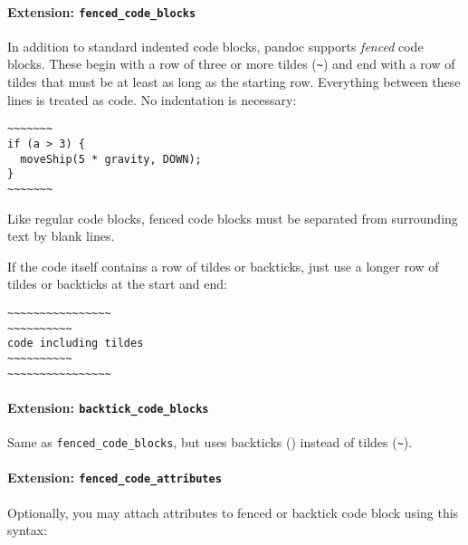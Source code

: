\documentclass[]{article}
\begin{document}
\hypertarget{extension-fenced_code_blocks}{%
\paragraph{\texorpdfstring{Extension:
\texttt{fenced\_code\_blocks}}{Extension: fenced\_code\_blocks}}\label{extension-fenced_code_blocks}}

In addition to standard indented code blocks, pandoc supports
\emph{fenced} code blocks. These begin with a row of three or more
tildes (\texttt{\textasciitilde{}}) and end with a row of tildes that
must be at least as long as the starting row. Everything between these
lines is treated as code. No indentation is necessary:

\begin{verbatim}
~~~~~~~
if (a > 3) {
  moveShip(5 * gravity, DOWN);
}
~~~~~~~
\end{verbatim}

Like regular code blocks, fenced code blocks must be separated from
surrounding text by blank lines.

If the code itself contains a row of tildes or backticks, just use a
longer row of tildes or backticks at the start and end:

\begin{verbatim}
~~~~~~~~~~~~~~~~
~~~~~~~~~~
code including tildes
~~~~~~~~~~
~~~~~~~~~~~~~~~~
\end{verbatim}

\hypertarget{extension-backtick_code_blocks}{%
\paragraph{\texorpdfstring{Extension:
\texttt{backtick\_code\_blocks}}{Extension: backtick\_code\_blocks}}\label{extension-backtick_code_blocks}}

Same as \texttt{fenced\_code\_blocks}, but uses backticks
(\texttt{\textasciigrave{}}) instead of tildes
(\texttt{\textasciitilde{}}).

\hypertarget{extension-fenced_code_attributes}{%
\paragraph{\texorpdfstring{Extension:
\texttt{fenced\_code\_attributes}}{Extension: fenced\_code\_attributes}}\label{extension-fenced_code_attributes}}

Optionally, you may attach attributes to fenced or backtick code block
using this syntax:
\end{document}
